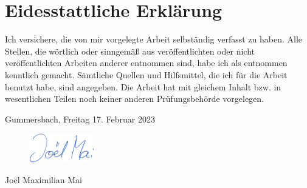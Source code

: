 \chapter*{Eidesstattliche Erklärung}

Ich versichere, die von mir vorgelegte Arbeit selbständig verfasst zu haben.\newline
Alle Stellen, die wörtlich oder sinngemäß aus veröffentlichten oder nicht veröffentlichten Arbeiten anderer entnommen sind, habe ich als entnommen kenntlich gemacht. Sämtliche Quellen und Hilfsmittel, die ich für die Arbeit benutzt habe, sind angegeben.\newline
Die Arbeit hat mit gleichem Inhalt bzw. in wesentlichen Teilen noch keiner anderen Prüfungsbehörde vorgelegen.
\vspace{1.5cm}

Gummersbach, Freitag 17. Februar 2023
\vspace{1cm}

\begin{figure}[!ht]
	\includegraphics[width=0.26\textwidth]{assets/images/mySignature.jpg}
\end{figure}

Joël Maximilian Mai